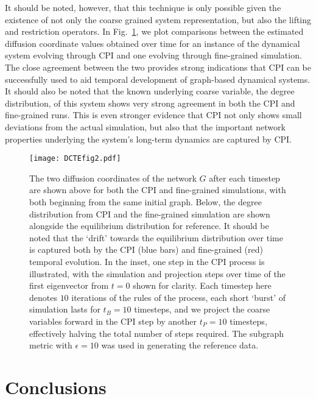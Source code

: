 It should be noted, however, that this technique is only possible
given the existence of not only the coarse grained system
representation, but also the lifting and restriction operators. In
Fig.~\ref{fig:CPI}, we plot comparisons between the estimated
diffusion coordinate values obtained over time for an instance of the
dynamical system evolving through CPI and one evolving through
fine-grained simulation. The close agreement between the two provides
strong indications that CPI can be successfully used to aid temporal
development of graph-based dynamical systems. It should also be noted
that the known underlying coarse variable, the degree distribution, of
this system shows very strong agreement in both the CPI and
fine-grained runs. This is even stronger evidence that CPI not only
shows small deviations from the actual simulation, but also that the
important network properties underlying the system's long-term
dynamics are captured by CPI.

\begin{figure}
  \begin{center}
    \texttt{[image: DCTEfig2.pdf]}
    \caption{\label{fig:CPI} The two diffusion coordinates of the
      network $G$ after each timestep are shown above for both the CPI
      and fine-grained simulations, with both beginning from the same
      initial graph. Below, the degree distribution from CPI and the
      fine-grained simulation are shown alongside the equilibrium
      distribution for reference. It should be noted that the `drift'
      towards the equilibrium distribution over time is captured both
      by the CPI (blue bars) and fine-grained (red) temporal
      evolution. In the inset, one step in the CPI process is
      illustrated, with the simulation and projection steps over time
      of the first eigenvector from $t = 0$ shown for clarity. Each
      timestep here denotes $10$ iterations of the rules of the
      process, each short `burst' of simulation lasts for $t_B = 10$
      timesteps, and we project the coarse variables forward in the
      CPI step by another $t_P = 10$ timesteps, effectively halving
      the total number of steps required. The subgraph metric with
      $\epsilon = 10$ was used in generating the reference data.  }
  \end{center}
\end{figure}

\section{\label{sec:conc} Conclusions}

